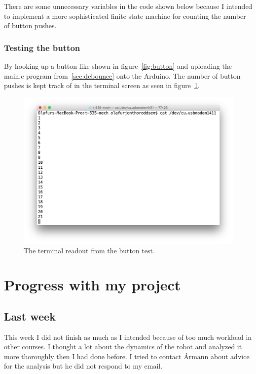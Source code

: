 \documentclass[11pt,a4paper,titlepage]{article}
\begin{document}
 	There are some unnecessary variables in the code shown below because I intended to implement a more sophisticated finite state machine for counting the number of button pushes.
 	
 	
	
	\subsubsection{Testing the button}
		By hooking up a button like shown in figure~\ref{fig:button} and uploading the main.c program from~\ref{sec:debounce} onto the Arduino.
		The number of button pushes is kept track of in the terminal screen as seen in figure~\ref{fig:buttontest}.
		
		\begin{figure}[H]
			\centering
			\includegraphics[width=\textwidth]{graphics/buttontest}
			\caption{The terminal readout from the button test.}
			\label{fig:buttontest}
		\end{figure}
	
	\pagebreak
	\section{Progress with my project}
	
	\subsection{Last week}
	This week I did not finish as much as I intended because of too much workload in other courses. I thought a lot about the dynamics of the robot and analyzed it more thoroughly then I had done before. I tried to contact Ármann about advice for the analysis but he did not respond to my email.
	
\end{document}
